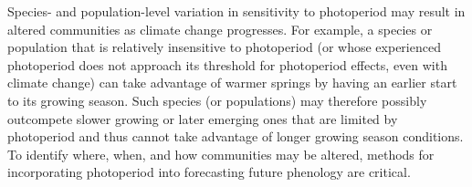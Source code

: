 \documentclass{article}
\begin{document}
\par Species- and population-level variation in sensitivity to photoperiod may result in altered communities as climate change progresses. For example, a species or population that is relatively insensitive to photoperiod (or whose experienced photoperiod does not approach its threshold for photoperiod effects, even with climate change) can take advantage of warmer springs by having an earlier start to its growing season. %
Such species (or populations) may therefore possibly outcompete slower growing or later emerging ones that are limited by photoperiod and thus cannot take advantage of longer growing season conditions. To identify where, when, and how communities may be altered, methods for incorporating photoperiod into forecasting future phenology are critical. 

\end{document}
